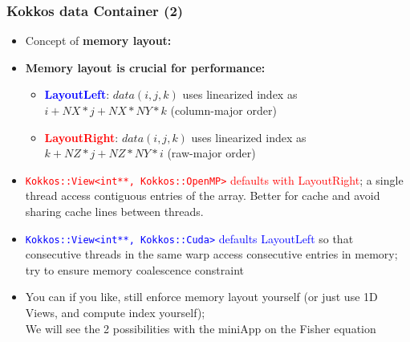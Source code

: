\begin{frame}[fragile=singleslide]
  \frametitle{Kokkos data Container (2)}

  \begin{itemize}
  \item Concept of \textbf{memory layout:}
  \item \textbf{Memory layout is crucial for performance:}
    \begin{itemize}
    \item \textcolor{blue}{\textbf{LayoutLeft}}: $data(i,j,k)$ uses linearized index as $i + NX*j + NX*NY * k$ (column-major order)
    \item \textcolor{red}{\textbf{LayoutRight}}: $data(i,j,k)$ uses linearized index as $k + NZ*j + NZ*NY * i$ (raw-major order)
    \end{itemize}
  \item \textcolor{red}{\texttt{Kokkos::View<int**, Kokkos::OpenMP>} defaults with LayoutRight}; a single thread access contiguous entries of the array. Better for cache and avoid sharing cache lines between threads.
  \item \textcolor{blue}{\texttt{Kokkos::View<int**, Kokkos::Cuda>} defaults LayoutLeft} so that consecutive threads in the same warp access consecutive entries in memory; try to ensure memory coalescence constraint
  \item You can if you like, still enforce memory layout yourself (or just use 1D Views, and compute index yourself);\\
    We will see the 2 possibilities with the miniApp on the Fisher equation
  \end{itemize}

\end{frame}

